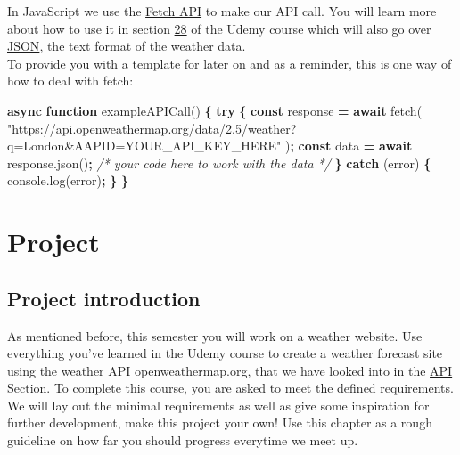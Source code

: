 \documentclass[
]{article}
\newenvironment{Shaded}{\begin{snugshade}}{\end{snugshade}}
\newcommand{\AttributeTok}[1]{\textcolor[rgb]{0.77,0.63,0.00}{#1}}
\newcommand{\CommentTok}[1]{\textcolor[rgb]{0.56,0.35,0.01}{\textit{#1}}}
\newcommand{\ControlFlowTok}[1]{\textcolor[rgb]{0.13,0.29,0.53}{\textbf{#1}}}
\newcommand{\KeywordTok}[1]{\textcolor[rgb]{0.13,0.29,0.53}{\textbf{#1}}}
\newcommand{\NormalTok}[1]{#1}
\newcommand{\OperatorTok}[1]{\textcolor[rgb]{0.81,0.36,0.00}{\textbf{#1}}}
\newcommand{\StringTok}[1]{\textcolor[rgb]{0.31,0.60,0.02}{#1}}
\newcommand{\VariableTok}[1]{\textcolor[rgb]{0.00,0.00,0.00}{#1}}
\begin{document}
In JavaScript we use the \href{https://developer.mozilla.org/de/docs/Web/API/Fetch_API}{Fetch API} to make our API call. You will learn more about how to use it in section \href{https://www.udemy.com/course/the-web-developer-bootcamp/learn/lecture/22051352\#overview}{28} of the Udemy course which will also go over \protect\hyperlink{json}{JSON}, the text format of the weather data.\\
To provide you with a template for later on and as a reminder, this is one way of how to deal with fetch:

\begin{Shaded}
\begin{Highlighting}[]
\KeywordTok{async} \KeywordTok{function} \AttributeTok{exampleAPICall}\NormalTok{() }\OperatorTok{\{}
  \ControlFlowTok{try} \OperatorTok{\{}
    \KeywordTok{const}\NormalTok{ response }\OperatorTok{=} \ControlFlowTok{await} \AttributeTok{fetch}\NormalTok{(}
      \StringTok{"https://api.openweathermap.org/data/2.5/weather?q=London&AAPID=YOUR_API_KEY_HERE"}
\NormalTok{    )}\OperatorTok{;}
    \KeywordTok{const}\NormalTok{ data }\OperatorTok{=} \ControlFlowTok{await} \VariableTok{response}\NormalTok{.}\AttributeTok{json}\NormalTok{()}\OperatorTok{;}
    \CommentTok{/* your code here to work with the data */}
  \OperatorTok{\}} \ControlFlowTok{catch}\NormalTok{ (error) }\OperatorTok{\{}
    \VariableTok{console}\NormalTok{.}\AttributeTok{log}\NormalTok{(error)}\OperatorTok{;}
  \OperatorTok{\}}
\OperatorTok{\}}
\end{Highlighting}
\end{Shaded}

\hypertarget{project}{%
\section{Project}\label{project}}

\hypertarget{project-introduction}{%
\subsection{Project introduction}\label{project-introduction}}

As mentioned before, this semester you will work on a weather website. Use everything you've learned in the Udemy course to create a weather forecast site using the weather API openweathermap.org, that we have looked into in the \protect\hyperlink{api}{API Section}. To complete this course, you are asked to meet the defined requirements. We will lay out the minimal requirements as well as give some inspiration for further development, make this project your own! Use this chapter as a rough guideline on how far you should progress everytime we meet up.
\end{document}
